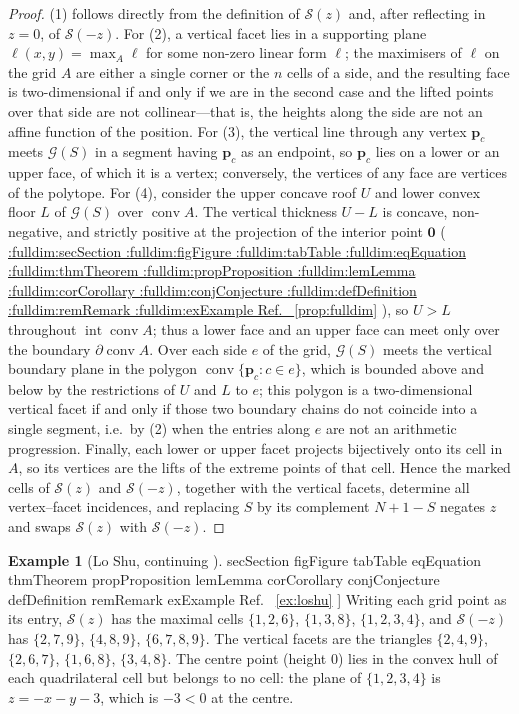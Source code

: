 \documentclass[11pt,a4paper]{article}
\makeatletter
\def\Cref@getprefix#1:#2\relax{#1}
\def\Cref@prefix@sec{sec}
\def\Cref@prefix@fig{fig}
\def\Cref@prefix@tab{tab}
\def\Cref@prefix@eq{eq}
\def\Cref@prefix@thm{thm}
\def\Cref@prefix@prop{prop}
\def\Cref@prefix@lem{lem}
\def\Cref@prefix@cor{cor}
\def\Cref@prefix@conj{conj}
\def\Cref@prefix@def{def}
\def\Cref@prefix@rem{rem}
\def\Cref@prefix@ex{ex}
\def\Cref@type@cap#1{%
  \edef\Cref@tmp{#1}%
  \ifx\Cref@tmp\Cref@prefix@sec Section%
  \else\ifx\Cref@tmp\Cref@prefix@fig Figure%
  \else\ifx\Cref@tmp\Cref@prefix@tab Table%
  \else\ifx\Cref@tmp\Cref@prefix@eq Equation%
  \else\ifx\Cref@tmp\Cref@prefix@thm Theorem%
  \else\ifx\Cref@tmp\Cref@prefix@prop Proposition%
  \else\ifx\Cref@tmp\Cref@prefix@lem Lemma%
  \else\ifx\Cref@tmp\Cref@prefix@cor Corollary%
  \else\ifx\Cref@tmp\Cref@prefix@conj Conjecture%
  \else\ifx\Cref@tmp\Cref@prefix@def Definition%
  \else\ifx\Cref@tmp\Cref@prefix@rem Remark%
  \else\ifx\Cref@tmp\Cref@prefix@ex Example%
  \else Ref.%
  \fi\fi\fi\fi\fi\fi\fi\fi\fi\fi\fi\fi
}
\DeclareRobustCommand{\Cref}[1]{%
  \begingroup
  \edef\Cref@label{#1}%
  \edef\Cref@prefix{\expandafter\Cref@getprefix\Cref@label:\relax}%
  \hyperref[#1]{\Cref@type@cap{\Cref@prefix}~\ref*{#1}}%
  \endgroup
}
\theoremstyle{plain}
\theoremstyle{definition}
\newtheorem{example}[theorem]{Example}
\theoremstyle{remark}
\makeatother
\begin{document}
\begin{proof}
(1) follows directly from the definition of $\mathcal S(z)$ and, after reflecting in $z=0$, of $\mathcal S(-z)$.
For (2), a vertical facet lies in a supporting plane $\ell(x,y)=\max_A\ell$ for some non-zero linear form $\ell$; the maximisers of $\ell$ on the grid $A$ are either a single corner or the $n$ cells of a side, and the resulting face is two-dimensional if and only if we are in the second case and the lifted points over that side are not collinear—that is, the heights along the side are not an affine function of the position.
For (3), the vertical line through any vertex $\mathbf p_c$ meets $\mathcal G(S)$ in a segment having $\mathbf p_c$ as an endpoint, so $\mathbf p_c$ lies on a lower or an upper face, of which it is a vertex; conversely, the vertices of any face are vertices of the polytope.
For (4), consider the upper concave roof $U$ and lower convex floor $L$ of $\mathcal G(S)$ over $\operatorname{conv}A$.
The vertical thickness $U-L$ is concave, non-negative, and strictly positive at the projection of the interior point $\mathbf 0$ (\Cref{prop:fulldim}), so $U>L$ throughout $\operatorname{int}\operatorname{conv}A$; thus a lower face and an upper face can meet only over the boundary $\partial\operatorname{conv}A$.
Over each side $e$ of the grid, $\mathcal G(S)$ meets the vertical boundary plane in the polygon $\operatorname{conv}\{\mathbf p_c: c\in e\}$, which is bounded above and below by the restrictions of $U$ and $L$ to $e$; this polygon is a two-dimensional vertical facet if and only if those two boundary chains do not coincide into a single segment, i.e.\ by (2) when the entries along $e$ are not an arithmetic progression.
Finally, each lower or upper facet projects bijectively onto its cell in $A$, so its vertices are the lifts of the extreme points of that cell.
Hence the marked cells of $\mathcal S(z)$ and $\mathcal S(-z)$, together with the vertical facets, determine all vertex--facet incidences, and replacing $S$ by its complement $N+1-S$ negates $z$ and swaps $\mathcal S(z)$ with $\mathcal S(-z)$.
\end{proof}

\begin{example}[Lo Shu, continuing \Cref{ex:loshu}]
\label{ex:loshu-subdiv}
Writing each grid point as its entry, $\mathcal S(z)$ has the maximal cells $\{1,2,6\}$, $\{1,3,8\}$, $\{1,2,3,4\}$, and $\mathcal S(-z)$ has $\{2,7,9\}$, $\{4,8,9\}$, $\{6,7,8,9\}$.
The vertical facets are the triangles $\{2,4,9\}$, $\{2,6,7\}$, $\{1,6,8\}$, $\{3,4,8\}$.
The centre point (height $0$) lies in the convex hull of each quadrilateral cell but belongs to no cell: the plane of $\{1,2,3,4\}$ is $z=-x-y-3$, which is $-3<0$ at the centre.
\end{example}
\end{document}
